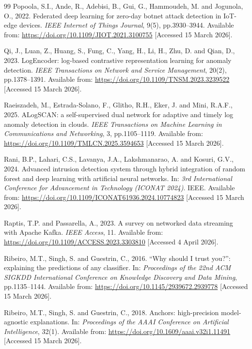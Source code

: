 \documentclass[12pt,a4paper]{report}
\begin{document}
\begin{thebibliography}{99}
Popoola, S.I., Ande, R., Adebisi, B., Gui, G., Hammoudeh, M. and Jogunola, O., 2022. Federated deep learning for zero-day botnet attack detection in IoT-edge devices. \textit{IEEE Internet of Things Journal}, 9(5), pp.3930--3944. Available from: \url{https://doi.org/10.1109/JIOT.2021.3100755} [Accessed 15 March 2026].

Qi, J., Luan, Z., Huang, S., Fung, C., Yang, H., Li, H., Zhu, D. and Qian, D., 2023. LogEncoder: log-based contrastive representation learning for anomaly detection. \textit{IEEE Transactions on Network and Service Management}, 20(2), pp.1378--1391. Available from: \url{https://doi.org/10.1109/TNSM.2023.3239522} [Accessed 15 March 2026].

Raeiszadeh, M., Estrada-Solano, F., Glitho, R.H., Eker, J. and Mini, R.A.F., 2025. ALogSCAN: a self-supervised dual network for adaptive and timely log anomaly detection in clouds. \textit{IEEE Transactions on Machine Learning in Communications and Networking}, 3, pp.1105--1119. Available from: \url{https://doi.org/10.1109/TMLCN.2025.3594653} [Accessed 15 March 2026].

Rani, B.P., Lahari, C.S., Lavanya, J.A., Lakshmanarao, A. and Kosuri, G.V., 2024. Advanced intrusion detection system through hybrid integration of random forest and deep learning with artificial neural networks. In: \textit{3rd International Conference for Advancement in Technology (ICONAT 2024)}. IEEE. Available from: \url{https://doi.org/10.1109/ICONAT61936.2024.10774823} [Accessed 15 March 2026].

Raptis, T.P. and Passarella, A., 2023. A survey on networked data streaming with Apache Kafka. \textit{IEEE Access}, 11. Available from: \url{https://doi.org/10.1109/ACCESS.2023.3303810} [Accessed 4 April 2026].

Ribeiro, M.T., Singh, S. and Guestrin, C., 2016. ``Why should I trust you?'': explaining the predictions of any classifier. In: \textit{Proceedings of the 22nd ACM SIGKDD International Conference on Knowledge Discovery and Data Mining}, pp.1135--1144. Available from: \url{https://doi.org/10.1145/2939672.2939778} [Accessed 15 March 2026].

Ribeiro, M.T., Singh, S. and Guestrin, C., 2018. Anchors: high-precision model-agnostic explanations. In: \textit{Proceedings of the AAAI Conference on Artificial Intelligence}, 32(1). Available from: \url{https://doi.org/10.1609/aaai.v32i1.11491} [Accessed 15 March 2026].


\end{thebibliography}
\end{document}
